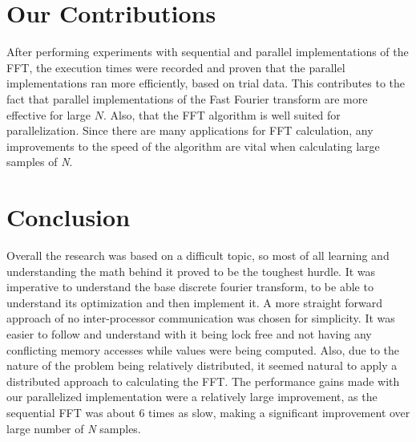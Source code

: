 \documentclass[journal]{IEEEtran}
\begin{document}
\section{Our Contributions}
	\par{
		After performing experiments with sequential and parallel implementations of the FFT, the execution times were 
		recorded and proven that the parallel implementations ran more efficiently, based on trial data. This contributes to the fact 
		that parallel implementations of the Fast Fourier transform are more effective for large $N$. Also, that the FFT algorithm 
		is well suited for parallelization. Since there are many applications for FFT calculation, any improvements to the speed 
		of the algorithm are vital when calculating large samples of \textit{N}.
	}
\section{Conclusion}
	\par{
		Overall the research was based on a difficult topic, so most of all learning and understanding the 
		math behind it proved to be the toughest hurdle. It was imperative to understand the base discrete 
		fourier transform, to be able to understand its optimization and then implement it. A more straight 
		forward approach of no inter-processor communication was chosen for simplicity. It was easier to 
		follow and understand with it being lock free and not having any conflicting memory accesses while 
		values were being computed. Also, due to the nature of the problem being relatively distributed, it 
		seemed natural to apply a distributed approach to calculating the FFT. The performance gains made 
		with our parallelized implementation were a relatively large improvement, as the sequential FFT was 
		about 6 times as slow, making a significant improvement over large number of \textit{N} samples.
	}

\medskip


\end{document}
